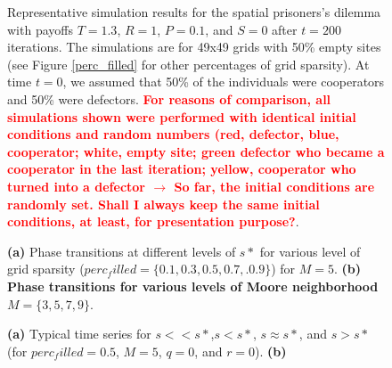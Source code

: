 \begin{figure}[h]
\begin{center}
\caption{Representative simulation results for the spatial prisoners's dilemma with payoffs $T=1.3$, $R=1$, $P=0.1$, and $S=0$ after $t=200$ iterations. The simulations are for 49x49 grids with 50\% empty sites (see Figure \ref{perc_filled} for other percentages of grid sparsity). At time $t=0$, we assumed that 50\% of the individuals were cooperators and 50\% were defectors. \textcolor{red}{\bf For reasons of comparison, all simulations shown were performed with identical initial conditions and random numbers (red, defector, blue, cooperator; white, empty site; green defector who became a cooperator in the last iteration; yellow, cooperator who turned into a defector $\rightarrow$ So far, the initial conditions are randomly set. Shall I always keep the same initial conditions, at least, for presentation purpose?}.}
\label{configurations}
\end{center}
\end{figure}

\begin{figure}[h]
\begin{center}
\caption{{\bf (a)} Phase transitions at different levels of $s*$ for various level of grid sparsity ($perc_filled = \{0.1,0.3,0.5,0.7,.0.9\}$) for $M=5$. {\bf (b) Phase transitions for various levels of Moore neighborhood $M=\{3,5,7,9\}$}.}
\label{phase_transition}
\end{center}
\end{figure}


\begin{figure}[h]
\begin{center}
\caption{{\bf (a)} Typical time series for $s << s*$,$s<s*$, $s\approx s*$, and $s > s*$ (for $perc_filled=0.5$, $M=5$, $q=0$, and $r=0$). {\bf (b)}  }
\label{phase_transition}
\end{center}
\end{figure}









